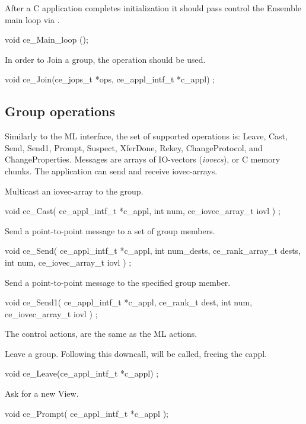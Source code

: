 After a C application completes initialization it should pass control 
the Ensemble main loop via .

\begin{codebox}
void ce_Main_loop ();
\end{codebox}
			 
In order to Join a group, the  operation should be used.
\begin{codebox}
void ce_Join(ce_jops_t *ops, ce_appl_intf_t *c_appl) ;
\end{codebox}


\subsection{Group operations}
Similarly to the ML interface, the set of supported operations is:
Leave, Cast, Send, Send1, Prompt, Suspect, XferDone, Rekey,
ChangeProtocol, and ChangeProperties. Messages are arrays of
IO-vectors ({\it iovecs}), or C memory chunks.  The application can
send and receive iovec-arrays.

Multicast an iovec-array to the group. 
\begin{codebox}
void ce_Cast(
    ce_appl_intf_t *c_appl,
    int num,
    ce_iovec_array_t iovl
) ;
\end{codebox}

Send a point-to-point message to a set of group members.
\begin{codebox}
void ce_Send(
    ce_appl_intf_t *c_appl,
    int num_dests,
    ce_rank_array_t dests,
    int num,
    ce_iovec_array_t iovl
) ;
\end{codebox}

Send a point-to-point message to the specified group member.
\begin{codebox}
void ce_Send1(
    ce_appl_intf_t *c_appl,
    ce_rank_t dest,
    int num,
    ce_iovec_array_t iovl
) ;
\end{codebox}

The control actions, are the same as the ML actions.

Leave a group. Following this downcall,  will be called, 
freeing the cappl. 
\begin{codebox}
void ce_Leave(ce_appl_intf_t *c_appl) ;
\end{codebox}

Ask for a new View.
\begin{codebox}
void ce_Prompt(
    ce_appl_intf_t *c_appl
);
\end{codebox}

